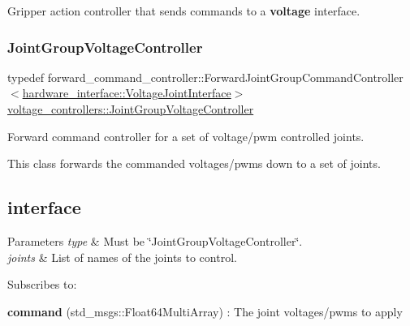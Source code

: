 Gripper action controller that sends commands to a {\bfseries voltage} interface. 

\mbox{\label{namespacevoltage__controllers_a468dac184f4bbe17dd09f819c6876ad4}} 
\subsubsection{\texorpdfstring{Joint\+Group\+Voltage\+Controller}{JointGroupVoltageController}}
{\footnotesize\ttfamily typedef forward\+\_\+command\+\_\+controller\+::\+Forward\+Joint\+Group\+Command\+Controller$<$\hyperlink{classhardware__interface_1_1_voltage_joint_interface}{hardware\+\_\+interface\+::\+Voltage\+Joint\+Interface}$>$ \hyperlink{namespacevoltage__controllers_a468dac184f4bbe17dd09f819c6876ad4}{voltage\+\_\+controllers\+::\+Joint\+Group\+Voltage\+Controller}}



Forward command controller for a set of voltage/pwm controlled joints. 

This class forwards the commanded voltages/pwms down to a set of joints.\hypertarget{namespacevoltage__controllers_ROS}{}\subsection{interface}\label{namespacevoltage__controllers_ROS}

\begin{DoxyParams}{Parameters}
{\em type} & Must be \char`\"{}\+Joint\+Group\+Voltage\+Controller\char`\"{}. \\
\hline
{\em joints} & List of names of the joints to control.\\
\hline
\end{DoxyParams}
Subscribes to\+:
\begin{DoxyItemize}
\item {\bfseries command} (std\+\_\+msgs\+::\+Float64\+Multi\+Array) \+: The joint voltages/pwms to apply 
\end{DoxyItemize}\mbox{\label{namespacevoltage__controllers_a342a187a35760323139ce1cad77898a6}} 
